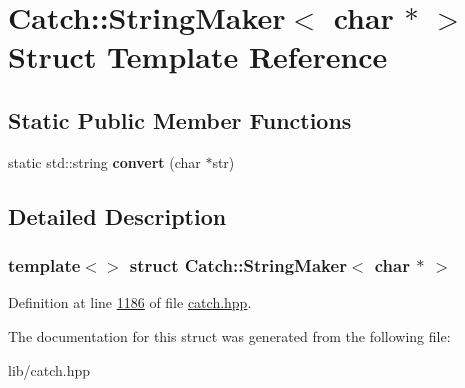 \hypertarget{structCatch_1_1StringMaker_3_01char_01_5_01_4}{}\section{Catch\+::String\+Maker$<$ char $\ast$ $>$ Struct Template Reference}
\label{structCatch_1_1StringMaker_3_01char_01_5_01_4}
\subsection*{Static Public Member Functions}
\begin{DoxyCompactItemize}
\item 
\mbox{\label{structCatch_1_1StringMaker_3_01char_01_5_01_4_a33049e24281ea6fba48bd8817bdd52bd}} 
static std\+::string {\bfseries convert} (char $\ast$str)
\end{DoxyCompactItemize}


\subsection{Detailed Description}
\subsubsection*{template$<$$>$\newline
struct Catch\+::\+String\+Maker$<$ char $\ast$ $>$}



Definition at line \mbox{\hyperlink{catch_8hpp_source_l01186}{1186}} of file \mbox{\hyperlink{catch_8hpp_source}{catch.\+hpp}}.



The documentation for this struct was generated from the following file\+:\begin{DoxyCompactItemize}
\item 
lib/catch.\+hpp\end{DoxyCompactItemize}

